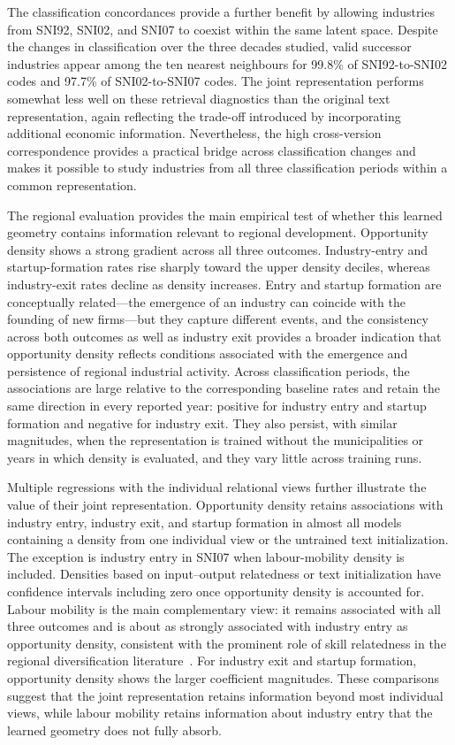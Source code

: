 \documentclass[9pt,twocolumn,twoside]{pnas-new}
\begin{document}
The classification concordances provide a further benefit by allowing industries from SNI92, SNI02, and SNI07 to coexist within the same latent space. Despite the changes in classification over the three decades studied, valid successor industries appear among the ten nearest neighbours for 99.8\% of SNI92-to-SNI02 codes and 97.7\% of SNI02-to-SNI07 codes. The joint representation performs somewhat less well on these retrieval diagnostics than the original text representation, again reflecting the trade-off introduced by incorporating additional economic information. Nevertheless, the high cross-version correspondence provides a practical bridge across classification changes and makes it possible to study industries from all three classification periods within a common representation.

The regional evaluation provides the main empirical test of whether this learned geometry contains information relevant to regional development. Opportunity density shows a strong gradient across all three outcomes. Industry-entry and startup-formation rates rise sharply toward the upper density deciles, whereas industry-exit rates decline as density increases. Entry and startup formation are conceptually related---the emergence of an industry can coincide with the founding of new firms---but they capture different events, and the consistency across both outcomes as well as industry exit provides a broader indication that opportunity density reflects conditions associated with the emergence and persistence of regional industrial activity. Across classification periods, the associations are large relative to the corresponding baseline rates and retain the same direction in every reported year: positive for industry entry and startup formation and negative for industry exit. They also persist, with similar magnitudes, when the representation is trained without the municipalities or years in which density is evaluated, and they vary little across training runs.

Multiple regressions with the individual relational views further illustrate the value of their joint representation. Opportunity density retains associations with industry entry, industry exit, and startup formation in almost all models containing a density from one individual view or the untrained text initialization. The exception is industry entry in SNI07 when labour-mobility density is included. Densities based on input--output relatedness or text initialization have confidence intervals including zero once opportunity density is accounted for. Labour mobility is the main complementary view: it remains associated with all three outcomes and is about as strongly associated with industry entry as opportunity density, consistent with the prominent role of skill relatedness in the regional diversification literature~\cite{neffkeSkillRelatednessFirm2013,neffkeHowRegionsDiversify2011}. For industry exit and startup formation, opportunity density shows the larger coefficient magnitudes. These comparisons suggest that the joint representation retains information beyond most individual views, while labour mobility retains information about industry entry that the learned geometry does not fully absorb.
\end{document}
